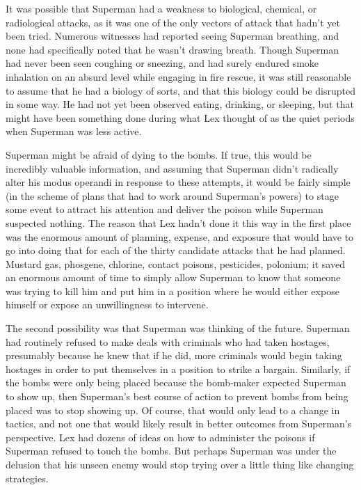 \documentclass[ebook,12pt]{memoir}
\begin{document}
It was possible that Superman had a weakness to biological, chemical, or
radiological attacks, as it was one of the only vectors of attack that
hadn't yet been tried. Numerous witnesses had reported seeing Superman
breathing, and none had specifically noted that he wasn't drawing
breath. Though Superman had never been seen coughing or sneezing, and
had surely endured smoke inhalation on an absurd level while engaging in
fire rescue, it was still reasonable to assume that he had a biology of
sorts, and that this biology could be disrupted in some way. He had not
yet been observed eating, drinking, or sleeping, but that might have
been something done during what Lex thought of as the quiet periods when
Superman was less active.

Superman might be afraid of dying to the bombs. If true, this would be
incredibly valuable information, and assuming that Superman didn't
radically alter his modus operandi in response to these attempts, it
would be fairly simple (in the scheme of plans that had to work around
Superman's powers) to stage some event to attract his attention and
deliver the poison while Superman suspected nothing. The reason that Lex
hadn't done it this way in the first place was the enormous amount of
planning, expense, and exposure that would have to go into doing that
for each of the thirty candidate attacks that he had planned. Mustard
gas, phosgene, chlorine, contact poisons, pesticides, polonium; it saved
an enormous amount of time to simply allow Superman to know that someone
was trying to kill him and put him in a position where he would either
expose himself or expose an unwillingness to intervene.

The second possibility was that Superman was thinking of the future.
Superman had routinely refused to make deals with criminals who had
taken hostages, presumably because he knew that if he did, more
criminals would begin taking hostages in order to put themselves in a
position to strike a bargain. Similarly, if the bombs were only being
placed because the bomb‐maker expected Superman to show up, then
Superman's best course of action to prevent bombs from being placed was
to stop showing up. Of course, that would only lead to a change in
tactics, and not one that would likely result in better outcomes from
Superman's perspective. Lex had dozens of ideas on how to administer the
poisons if Superman refused to touch the bombs. But perhaps Superman was
under the delusion that his unseen enemy would stop trying over a little
thing like changing strategies.
\end{document}
